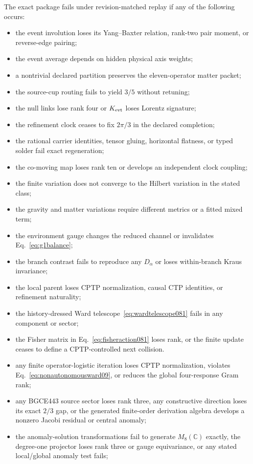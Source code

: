 \documentclass[11pt]{article}
\theoremstyle{definition}
\theoremstyle{remark}
\begin{document}
The exact package fails under revision-matched replay if any of the following occurs:
\begin{itemize}
\item the event involution loses its Yang--Baxter relation, rank-two pair moment, or reverse-edge pairing;
\item the event average depends on hidden physical axis weights;
\item a nontrivial declared partition preserves the eleven-operator matter packet;
\item the source-cup routing fails to yield $3/5$ without retuning;
\item the null links lose rank four or $K_{\rm evt}$ loses Lorentz signature;
\item the refinement clock ceases to fix $2\pi/3$ in the declared completion;
\item the rational carrier identities, tensor gluing, horizontal flatness, or typed solder fail exact regeneration;
\item the co-moving map loses rank ten or develops an independent clock coupling;
\item the finite variation does not converge to the Hilbert variation in the stated class;
\item the gravity and matter variations require different metrics or a fitted mixed term;
\item the environment gauge changes the reduced channel or invalidates Eq.~\eqref{eq:g1balance};
\item the branch contrast fails to reproduce any $D_\alpha$ or loses within-branch Kraus invariance;
\item the local parent loses CPTP normalization, causal CTP identities, or refinement naturality;
\item the history-dressed Ward telescope~\eqref{eq:wardtelescope081} fails in any component or sector;
\item the Fisher matrix in Eq.~\eqref{eq:fisheraction081} loses rank, or the finite update ceases to define a CPTP-controlled next collision.
\item any finite operator-logistic iteration loses CPTP normalization, violates Eq.~\eqref{eq:nonautonomousward09}, or reduces the global four-response Gram rank;
\item any BGCE443 source sector loses rank three, any constructive direction loses its exact $2/3$ gap, or the generated finite-order derivation algebra develops a nonzero Jacobi residual or central anomaly;
\item the anomaly-solution transformations fail to generate $M_8(\mathbb C)$ exactly, the degree-one projector loses rank three or gauge equivariance, or any stated local/global anomaly test fails;

\end{itemize}
\end{document}
